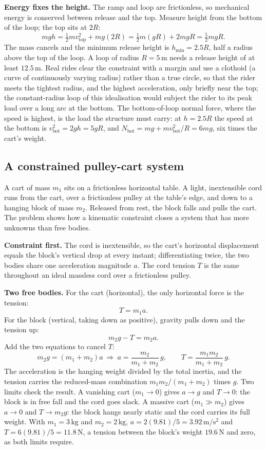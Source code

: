 \textbf{Energy fixes the height.} The ramp and loop are frictionless,
so mechanical energy is conserved between release and the top. Measure
height from the bottom of the loop; the top sits at $2R$:
\[
mgh = \tfrac{1}{2}m v_{\text{top}}^{2}+mg(2R)
= \tfrac{1}{2}m(gR)+2mgR = \tfrac{5}{2}mgR.
\]
The mass cancels and the minimum release height is $h_{\min}=2.5R$,
half a radius above the top of the loop. A loop of radius
$R=5\,\si{\meter}$ needs a release height of at least $12.5\,\si{
\meter}$. Real rides clear the constraint with a margin and use a
clothoid (a curve of continuously varying radius) rather than a true
circle, so that the rider meets the tightest radius, and the highest
acceleration, only briefly near the top; the constant-radius loop of
this idealisation would subject the rider to its peak load over a long
arc at the bottom. The bottom-of-loop normal force, where the speed is
highest, is the load the structure must carry: at $h=2.5R$ the speed at
the bottom is $v_{\text{bot}}^{2}=2gh=5gR$, and $N_{\text{bot}}=mg+
mv_{\text{bot}}^{2}/R=6mg$, six times the cart's weight.

\subsection{A constrained pulley-cart system}

A cart of mass $m_{1}$ sits on a frictionless horizontal table.
A light, inextensible cord runs from the cart, over a frictionless
pulley at the table's edge, and down to a hanging block of mass
$m_{2}$. Released from rest, the block falls and pulls the cart. The
problem shows how a kinematic constraint closes a system that has more
unknowns than free bodies.

\textbf{Constraint first.} The cord is inextensible, so the cart's
horizontal displacement equals the block's vertical drop at every
instant; differentiating twice, the two bodies share one acceleration
magnitude $a$. The cord tension $T$ is the same throughout an ideal
massless cord over a frictionless pulley.

\textbf{Two free bodies.} For the cart (horizontal), the only
horizontal force is the tension:
\[
T = m_{1} a.
\]
For the block (vertical, taking down as positive), gravity pulls down
and the tension up:
\[
m_{2} g - T = m_{2} a.
\]
Add the two equations to cancel $T$:
\[
m_{2} g = (m_{1}+m_{2}) a \ \Rightarrow\
a = \frac{m_{2}}{m_{1}+m_{2}}\,g, \qquad
T = \frac{m_{1} m_{2}}{m_{1}+m_{2}}\,g.
\]
The acceleration is the hanging weight divided by the total inertia,
and the tension carries the reduced-mass combination $m_{1}m_{2}/
(m_{1}+m_{2})$ times $g$. Two limits check the result. A vanishing cart
($m_{1}\to 0$) gives $a\to g$ and $T\to 0$: the block is in free fall
and the cord goes slack. A massive cart ($m_{1}\gg m_{2}$) gives $a\to
0$ and $T\to m_{2}g$: the block hangs nearly static and the cord
carries its full weight. With $m_{1}=3\,\si{\kilogram}$ and
$m_{2}=2\,\si{\kilogram}$, $a=2(9.81)/5=3.92\,\si{\meter\per\second
\squared}$ and $T=6(9.81)/5=11.8\,\si{\newton}$, a tension between the
block's weight $19.6\,\si{\newton}$ and zero, as both limits require.

